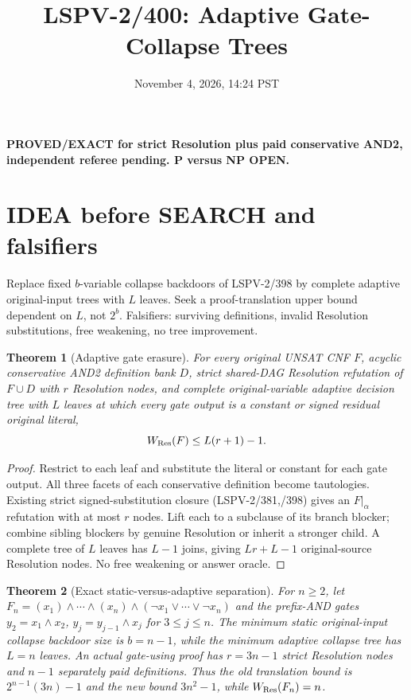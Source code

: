 \documentclass{article}
\newtheorem{theorem}{Theorem}
\begin{document}
\title{LSPV-2/400: Adaptive Gate-Collapse Trees}
\date{November 4, 2026, 14:24 PST}
\maketitle
\textbf{PROVED/EXACT for strict Resolution plus paid conservative AND2, independent referee pending. P versus NP OPEN.}
\section*{IDEA before SEARCH and falsifiers}
Replace fixed $b$-variable collapse backdoors of LSPV-2/398 by complete adaptive original-input trees with $L$ leaves. Seek a proof-translation upper bound dependent on $L$, not $2^b$. Falsifiers: surviving definitions, invalid Resolution substitutions, free weakening, no tree improvement.
\begin{theorem}[Adaptive gate erasure]
For every original UNSAT CNF $F$, acyclic conservative AND2 definition bank $D$, strict shared-DAG Resolution refutation of $F\cup D$ with $r$ Resolution nodes, and complete original-variable adaptive decision tree with $L$ leaves at which every gate output is a constant or signed residual original literal,
\[W_{\rm Res}(F)\le L(r+1)-1.\]
\end{theorem}
\begin{proof} Restrict to each leaf and substitute the literal or constant for each gate output. All three facets of each conservative definition become tautologies. Existing strict signed-substitution closure (LSPV-2/381,/398) gives an $F|_\alpha$ refutation with at most $r$ nodes. Lift each to a subclause of its branch blocker; combine sibling blockers by genuine Resolution or inherit a stronger child. A complete tree of $L$ leaves has $L-1$ joins, giving $Lr+L-1$ original-source Resolution nodes. No free weakening or answer oracle. \end{proof}
\begin{theorem}[Exact static-versus-adaptive separation]
For $n\ge2$, let $F_n=(x_1)\land\cdots\land(x_n)\land(\neg x_1\lor\cdots\lor\neg x_n)$ and the prefix-AND gates $y_2=x_1\land x_2$, $y_j=y_{j-1}\land x_j$ for $3\le j\le n$. The minimum static original-input collapse backdoor size is $b=n-1$, while the minimum adaptive collapse tree has $L=n$ leaves. An actual gate-using proof has $r=3n-1$ strict Resolution nodes and $n-1$ separately paid definitions. Thus the old translation bound is $2^{n-1}(3n)-1$ and the new bound $3n^2-1$, while $W_{\rm Res}(F_n)=n$.
\end{theorem}
\end{document}
